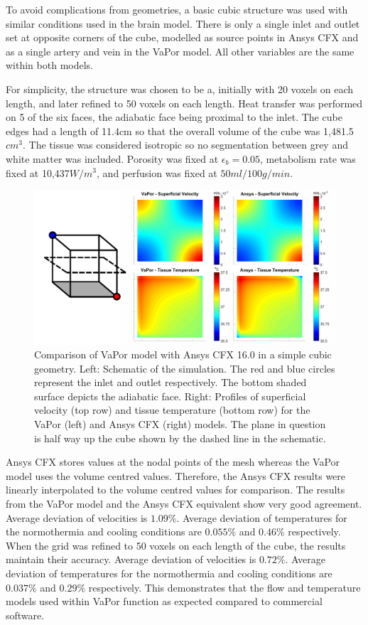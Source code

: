 \documentclass[11pt,english,a4paper,twoside,openright]{report}
\begin{document}
{{{{{{{{To avoid complications from geometries, a basic cubic structure was used with similar conditions used in the brain model. There is only a single inlet and outlet set at opposite corners of the cube, modelled as source points in Ansys CFX and as a single artery and vein in the VaPor model. All other variables are the same within both models.

For simplicity, the structure was chosen to be a, initially with 20 voxels on each length, and later refined to 50 voxels on each length. Heat transfer was performed on 5 of the six faces, the adiabatic face being proximal to the inlet. The cube edges had a length of 11.4cm so that the overall volume of the cube was 1,481.5$cm^{3}$. The tissue was considered isotropic so no segmentation between grey and white matter was included. Porosity was fixed at $\epsilon_{b}=0.05$, metabolism rate was fixed at 10,437$W/m^{3}$, and perfusion was fixed at $50ml/100g/min$. 

\begin{figure}[h]
	\centering
	\includegraphics[width=\textwidth]{Chapter3/AnsysComparison}
	\caption[Comparison of VaPor model with Ansys CFX 16.0 in a simple cubic geometry]{Comparison of VaPor model with Ansys CFX 16.0 in a simple cubic geometry. Left: Schematic of the simulation. The red and blue circles represent the inlet and outlet respectively. The bottom shaded surface depicts the adiabatic face. Right: Profiles of superficial velocity (top row) and tissue temperature (bottom row) for the VaPor (left) and Ansys CFX (right) models. The plane in question is half way up the cube shown by the dashed line in the schematic.}
	\label{fig:AnsysComparison}
\end{figure}

Ansys CFX stores values at the nodal points of the mesh whereas the VaPor model uses the volume centred values. Therefore, the Ansys CFX results were linearly interpolated to the volume centred values for comparison. The results from the VaPor model and the Ansys CFX equivalent show very good agreement.  Average deviation of velocities is $1.09\%$. Average deviation of temperatures for the normothermia and cooling conditions are $0.055\%$ and $0.46\%$ respectively. When the grid was refined to 50 voxels on each length of the cube, the results maintain their accuracy. Average deviation of velocities is $0.72\%$. Average deviation of temperatures for the normothermia and cooling conditions are $0.037\%$ and $0.29\%$ respectively. This demonstrates that the flow and temperature models used within VaPor function as expected compared to commercial software.

}}}}}}}}
\end{document}
